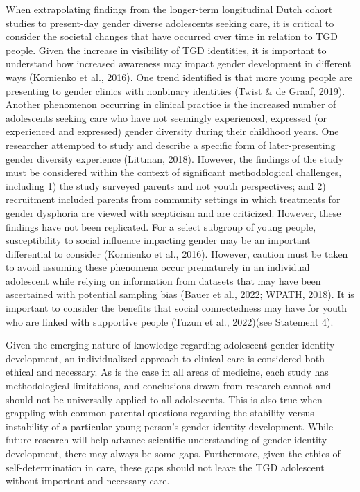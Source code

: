 \documentclass[
]{book}
\begin{document}
When extrapolating findings from the
longer-term longitudinal Dutch cohort studies to
present-day gender diverse adolescents seeking care,
it is critical to consider the societal changes that
have occurred over time in relation to TGD people.
Given the increase in visibility of TGD identities,
it is important to understand how increased awareness may impact gender development in different
ways (Kornienko et al., 2016). One trend identified
is that more young people are presenting to gender
clinics with nonbinary identities (Twist \& de Graaf,
2019). Another phenomenon occurring in clinical
practice is the increased number of adolescents
seeking care who have not seemingly experienced,
expressed (or experienced and expressed) gender
diversity during their childhood years. One
researcher attempted to study and describe a specific form of later-presenting gender diversity experience (Littman, 2018). However, the findings of
the study must be considered within the context
of significant methodological challenges, including
1) the study surveyed parents and not youth perspectives; and 2) recruitment included parents from
community settings in which treatments for gender
dysphoria are viewed with scepticism and are criticized. However, these findings have not been replicated. For a select subgroup of young people,
susceptibility to social influence impacting gender
may be an important differential to consider
(Kornienko et al., 2016). However, caution must
be taken to avoid assuming these phenomena occur
prematurely in an individual adolescent while relying on information from datasets that may have
been ascertained with potential sampling bias
(Bauer et al., 2022; WPATH, 2018). It is important
to consider the benefits that social connectedness
may have for youth who are linked with supportive
people (Tuzun et al., 2022)(see Statement 4).

Given the emerging nature of knowledge
regarding adolescent gender identity development,
an individualized approach to clinical care is considered both ethical and necessary. As is the case
in all areas of medicine, each study has methodological limitations, and conclusions drawn from
research cannot and should not be universally
applied to all adolescents. This is also true when
grappling with common parental questions
regarding the stability versus instability of a particular young person's gender identity development. While future research will help advance
scientific understanding of gender identity development, there may always be some gaps.
Furthermore, given the ethics of self-determination
in care, these gaps should not leave the TGD
adolescent without important and necessary care.
\end{document}
